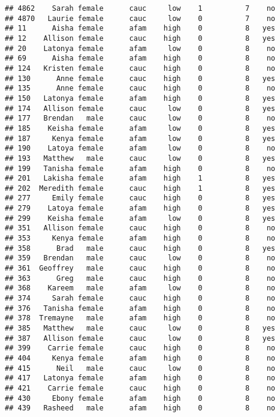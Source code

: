 \documentclass[
]{article}
\begin{document}
\begin{verbatim}
## 4862    Sarah female      cauc     low    1          7    no
## 4870   Laurie female      cauc     low    0          7    no
## 11      Aisha female      afam    high    0          8   yes
## 12    Allison female      cauc    high    0          8   yes
## 20    Latonya female      afam     low    0          8    no
## 69      Aisha female      afam    high    0          8    no
## 124   Kristen female      cauc    high    0          8    no
## 130      Anne female      cauc    high    0          8   yes
## 135      Anne female      cauc    high    0          8    no
## 150   Latonya female      afam    high    0          8   yes
## 174   Allison female      cauc     low    0          8   yes
## 177   Brendan   male      cauc     low    0          8    no
## 185    Keisha female      afam     low    0          8   yes
## 187     Kenya female      afam     low    0          8   yes
## 190    Latoya female      afam     low    0          8    no
## 193   Matthew   male      cauc     low    0          8   yes
## 199   Tanisha female      afam    high    0          8    no
## 201   Lakisha female      afam    high    1          8   yes
## 202  Meredith female      cauc    high    1          8   yes
## 277     Emily female      cauc    high    0          8   yes
## 279    Latoya female      afam    high    0          8   yes
## 299    Keisha female      afam     low    0          8   yes
## 351   Allison female      cauc    high    0          8    no
## 353     Kenya female      afam    high    0          8    no
## 358      Brad   male      cauc    high    0          8   yes
## 359   Brendan   male      cauc     low    0          8    no
## 361  Geoffrey   male      cauc    high    0          8    no
## 363      Greg   male      cauc    high    0          8    no
## 368    Kareem   male      afam     low    0          8    no
## 374     Sarah female      cauc    high    0          8    no
## 376   Tanisha female      afam    high    0          8    no
## 378  Tremayne   male      afam    high    0          8    no
## 385   Matthew   male      cauc     low    0          8   yes
## 387   Allison female      cauc     low    0          8   yes
## 399    Carrie female      cauc    high    0          8    no
## 404     Kenya female      afam    high    0          8    no
## 415      Neil   male      cauc     low    0          8    no
## 417   Latonya female      afam    high    0          8    no
## 421    Carrie female      cauc    high    0          8    no
## 430     Ebony female      afam    high    0          8    no
## 439   Rasheed   male      afam    high    0          8    no

\end{verbatim}
\end{document}
